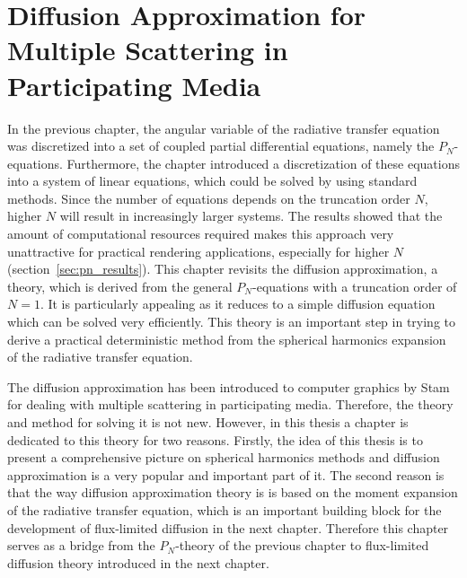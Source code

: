 \chapter[Diffusion for Multiple Scattering in Participating Media]{Diffusion Approximation for Multiple Scattering in Participating Media}
%
\label{sec:diffusion_approximation}

In the previous chapter, the angular variable of the radiative transfer equation was discretized into a set of coupled partial differential equations, namely the $P_N$-equations. Furthermore, the chapter introduced a discretization of these equations into a system of linear equations, which could be solved by using standard methods. Since the number of equations depends on the truncation order $N$, higher $N$ will result in increasingly larger systems. The results showed that the amount of computational resources required makes this approach very unattractive for practical rendering applications, especially for higher $N$ (section~\ref{sec:pn_results}). This chapter revisits the diffusion approximation, a theory, which is derived from the general $P_N$-equations with a truncation order of $N=1$. It is particularly appealing as it reduces to a simple diffusion equation which can be solved very efficiently. This theory is an important step in trying to derive a practical deterministic method from the spherical harmonics expansion of the radiative transfer equation.

The diffusion approximation has been introduced to computer graphics by Stam~\cite{Stam95} for dealing with multiple scattering in participating media. Therefore, the theory and method for solving it is not new. However, in this thesis a chapter is dedicated to this theory for two reasons. Firstly, the idea of this thesis is to present a comprehensive picture on spherical harmonics methods and diffusion approximation is a very popular and important part of it. The second reason is that the way diffusion approximation theory is is based on the moment expansion of the radiative transfer equation, which is an important building block for the development of flux-limited diffusion in the next chapter. Therefore this chapter serves as a bridge from the $P_N$-theory of the previous chapter to flux-limited diffusion theory introduced in the next chapter.

